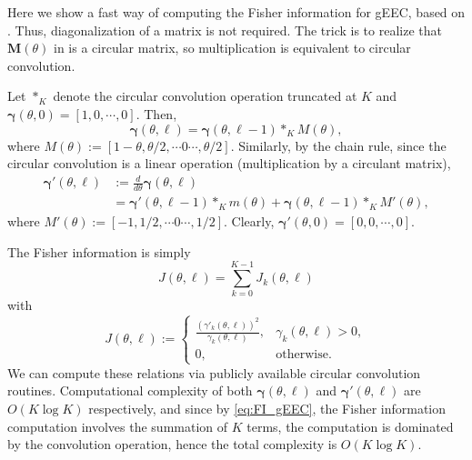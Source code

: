 \documentclass[12pt]{article}
\numberwithin{equation}{section}
\numberwithin{table}{section}
\numberwithin{figure}{section}
\newcommand{\be}{\begin{equation}}
\newcommand{\ee}{\end{equation}}
\def\bM{\mathbf{M}}
\def\bgamma{\boldsymbol{\gamma}}
\begin{document}
Here we show a fast way of computing the Fisher information for gEEC, based on \cite[Lemma 1]{Hua12gEEC}. Thus, diagonalization of a 
matrix is not required. The trick is to realize that $\bM(\theta)$ in \cite[Equation (26), Lemma 1]{Hua12gEEC} is a circular matrix, so multiplication 
is equivalent to circular convolution.

Let $\ast_K$ denote the circular convolution operation truncated at $K$ and $\bgamma(\theta,0) = [1,0,\cdots,0]$. Then, 
\be
\bgamma(\theta,\ell) = \bgamma(\theta,\ell-1) \ast_K M(\theta),
\ee
where $M(\theta) := [1-\theta,\theta/2,\cdots 0 \cdots,\theta/2]$.  Similarly, by the chain rule, since 
the circular convolution is a linear operation (multiplication by a circulant matrix),
\begin{align*}
\bgamma'(\theta,\ell) &:= \frac{d}{d\theta} \bgamma(\theta,\ell)\\
&= \bgamma'(\theta,\ell-1) \ast_K m(\theta) + \bgamma(\theta,\ell-1) \ast_K M'(\theta),
\end{align*}
where $M'(\theta) :=  [-1,1/2,\cdots 0 \cdots,1/2]$. Clearly, $\bgamma'(\theta,0) = [0,0,\cdots,0]$.

The Fisher information is simply
\be
J(\theta,\ell) = \sum_{k=0}^{K-1} J_k(\theta,\ell)
\label{eq:FI_gEEC}
\ee
with
\be
J(\theta,\ell) := 
\begin{cases}
\frac{(\gamma'_k(\theta,\ell))^2}{\gamma_k(\theta,\ell)}, & \gamma_k(\theta,\ell) > 0,\\
0, & \text{otherwise}.
\end{cases}
\ee
We can compute these relations via publicly available circular convolution routines. Computational complexity of both $\bgamma(\theta,\ell)$ 
and $\bgamma'(\theta,\ell)$ are $O(K \log K)$ respectively, and since by \eqref{eq:FI_gEEC}, the Fisher information computation involves
the summation of $K$ terms, the computation is dominated by the convolution operation, hence the total complexity is $O(K \log K)$.

 
\appendix



\end{document}
